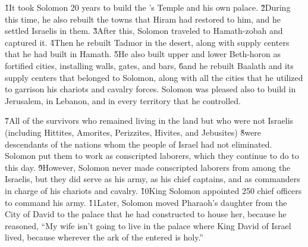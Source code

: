 \v{1}It took Solomon 20 years to build the 's Temple and his own palace. \v{2}During this time, he also rebuilt the towns that Hiram had restored to him, and he settled Israelis in them. \v{3}After this, Solomon traveled to Hamath-zobah and captured it. \v{4}Then he rebuilt Tadmor in the desert, along with supply centers that he had built in Hamath. \v{5}He also built upper and lower Beth-horon as fortified cities, installing walls, gates, and bars, \v{6}and he rebuilt Baalath and its supply centers that belonged to Solomon, along with all the cities that he utilized to garrison his chariots and cavalry forces. Solomon was pleased also to build in Jerusalem, in Lebanon, and in every territory that he controlled.

\v{7}All of the survivors who remained living in the land but who were not Israelis (including Hittites, Amorites, Perizzites, Hivites, and Jebusites) \v{8}were descendants of the nations whom the people of Israel had not eliminated. Solomon put them to work as conscripted laborers, which they continue to do to this day. \v{9}However, Solomon never made conscripted laborers from among the Israelis, but they did serve as his army, as his chief captains, and as commanders in charge of his chariots and cavalry. \v{10}King Solomon appointed 250 chief officers to command his army. \v{11}Later, Solomon moved Pharaoh's daughter from the City of David to the palace that he had constructed to house her, because he reasoned, ``My wife isn't going to live in the palace where King David of Israel lived, because wherever the ark of the  entered is holy.''

